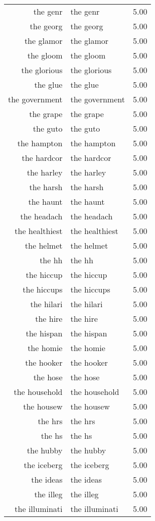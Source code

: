 \begin{table}[ht]
\begin{tabular}{rlr}
  the genr & the genr & 5.00 \\ 
  the georg & the georg & 5.00 \\ 
  the glamor & the glamor & 5.00 \\ 
  the gloom & the gloom & 5.00 \\ 
  the glorious & the glorious & 5.00 \\ 
  the glue & the glue & 5.00 \\ 
  the government & the government & 5.00 \\ 
  the grape & the grape & 5.00 \\ 
  the guto & the guto & 5.00 \\ 
  the hampton & the hampton & 5.00 \\ 
  the hardcor & the hardcor & 5.00 \\ 
  the harley & the harley & 5.00 \\ 
  the harsh & the harsh & 5.00 \\ 
  the haunt & the haunt & 5.00 \\ 
  the headach & the headach & 5.00 \\ 
  the healthiest & the healthiest & 5.00 \\ 
  the helmet & the helmet & 5.00 \\ 
  the hh & the hh & 5.00 \\ 
  the hiccup & the hiccup & 5.00 \\ 
  the hiccups & the hiccups & 5.00 \\ 
  the hilari & the hilari & 5.00 \\ 
  the hire & the hire & 5.00 \\ 
  the hispan & the hispan & 5.00 \\ 
  the homie & the homie & 5.00 \\ 
  the hooker & the hooker & 5.00 \\ 
  the hose & the hose & 5.00 \\ 
  the household & the household & 5.00 \\ 
  the housew & the housew & 5.00 \\ 
  the hrs & the hrs & 5.00 \\ 
  the hs & the hs & 5.00 \\ 
  the hubby & the hubby & 5.00 \\ 
  the iceberg & the iceberg & 5.00 \\ 
  the ideas & the ideas & 5.00 \\ 
  the illeg & the illeg & 5.00 \\ 
  the illuminati & the illuminati & 5.00 \\ 

\end{tabular}
\end{table}
